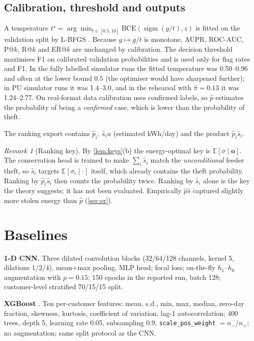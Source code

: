 \documentclass[11pt,a4paper]{article}
\theoremstyle{plain}
\theoremstyle{definition}
\theoremstyle{remark}
\newtheorem{remark}{Remark}
\newcommand{\E}{\mathbb{E}}
\newcommand{\sig}{\operatorname{sigm}}
\begin{document}
\subsection{Calibration, threshold and outputs}
\label{sec:calib}
A temperature $t^\star=\arg\min_{t\in[0.5,10]}\mathrm{BCE}(\sig(g/t),z)$ is fitted on the validation split by L-BFGS \citep{guo2017}. Because $g\mapsto g/t$ is monotone, AUPR, ROC-AUC, P@$k$, R@$k$ and ER@$k$ are unchanged by calibration. The decision threshold maximises F1 on calibrated validation probabilities and is used only for flag rates and F1. In the fully labelled simulator runs the fitted temperature was 0.50--0.96 and often at the lower bound $0.5$ (the optimiser would have sharpened further); in PU simulator runs it was 1.4--3.0, and in the rehearsal with $\hat\pi=0.13$ it was 1.24--2.77. On real-format data calibration uses confirmed labels, so $\hat p$ estimates the probability of being a \emph{confirmed} case, which is lower than the probability of theft.

The ranking export contains $\hat p_i$, $\hat s_i u$ (estimated kWh/day) and the product $\hat p_i\hat s_i$.

\begin{remark}[Ranking key]
By \cref{lem:keys}(b) the energy-optimal key is $\E[\sigma\mid\bm o]$. The conservation head is trained to make $\sum_i\hat s_i$ match the \emph{unconditional} feeder theft, so $\hat s_i$ targets $\E[\sigma_i\mid\cdot]$ itself, which already contains the theft probability. Ranking by $\hat p_i\hat s_i$ then counts the probability twice. Ranking by $\hat s_i$ alone is the key the theory suggests; it has not been evaluated. Empirically $\hat p\hat s$ captured slightly more stolen energy than $\hat p$ (\cref{sec:er}).
\end{remark}

\section{Baselines}
\label{sec:baselines}
\textbf{1-D CNN.} Three dilated convolution blocks (32/64/128 channels, kernel 5, dilations 1/2/4), mean+max pooling, MLP head; focal loss; on-the-fly $h_1$--$h_6$ augmentation with $p=0.15$; 150 epochs in the reported run, batch 128; customer-level stratified 70/15/15 split.

\textbf{XGBoost} \citep{buzau2019}. Ten per-customer features: mean, s.d., min, max, median, zero-day fraction, skewness, kurtosis, coefficient of variation, lag-1 autocorrelation; 400 trees, depth 5, learning rate 0.05, subsampling 0.9, \texttt{scale\_pos\_weight} $=n_-/n_+$; no augmentation; same split protocol as the CNN.
\end{document}
